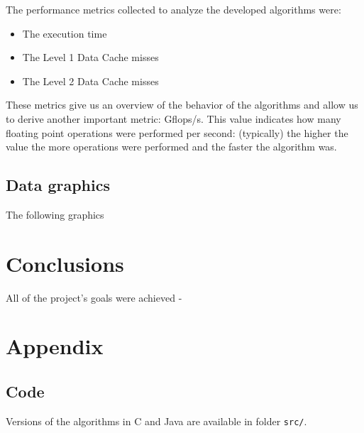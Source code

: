 \documentclass[11pt,a4paper]{article}
\begin{document}
The performance metrics collected to analyze the developed algorithms were:

\begin{itemize}
    \item The execution time
    \item The Level 1 Data Cache misses
    \item The Level 2 Data Cache misses
\end{itemize}

These metrics give us an overview of the behavior of the algorithms and allow us to derive another important metric: Gflops/s. This value indicates how many floating point operations were performed per second: (typically) the higher the value the more operations were performed and the faster the algorithm was.

\subsection{Data graphics}

The following graphics

\section{Conclusions}

All of the project's goals were achieved -

\onecolumn
\appendix
\section{Appendix}

\subsection{Code}

\noindent Versions of the algorithms in C and Java are available in folder \lstinline{src/}.
\end{document}
